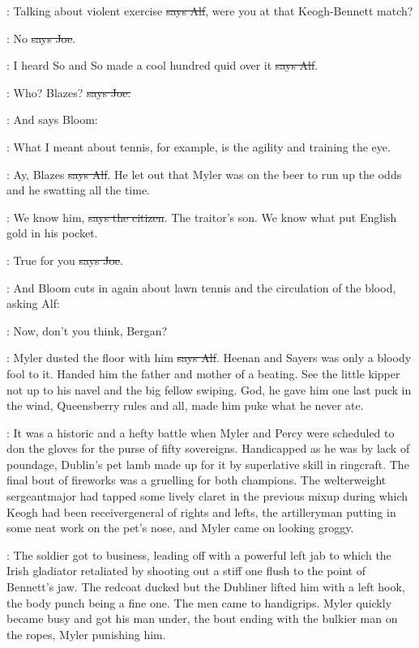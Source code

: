 \bergan:
Talking about violent exercise \sout{says Alf},
were you at that Keogh-Bennett match?

\joe:
No \sout{says Joe}.

\bergan:
I heard So and So made a cool hundred quid
over it \sout{says Alf}.

\joe:
Who? Blazes? \sout{says Joe.}

\Nq:
And says Bloom:

\Bloom:
What I meant about tennis, for example,
is the agility and training the eye.

\bergan:
Ay, Blazes \sout{says Alf}.
He let out that Myler was on the beer to run up
the odds and he swatting all the time.

\citizen:
We know him, \sout{says the citizen}.
The traitor's son. We know what put
English gold in his pocket.

\joe:
True for you \sout{says Joe}.

\Nq:
And Bloom cuts in again about lawn tennis and the circulation of the
blood, asking Alf:

\Bloom:
Now, don't you think, Bergan?

\bergan:
Myler dusted the floor with him \sout{says Alf}.
Heenan and Sayers was only a
bloody fool to it. Handed him the father and mother of a beating. See the
little kipper not up to his navel and the big fellow swiping. God, he gave
him one last puck in the wind, Queensberry rules and all, made him puke
what he never ate.

:
It was a historic and a hefty battle when Myler and Percy were
scheduled to don the gloves for the purse of fifty sovereigns. Handicapped
as he was by lack of poundage, Dublin's pet lamb made up for it by
superlative skill in ringcraft. The final bout of fireworks was a
gruelling for both champions. The welterweight sergeantmajor had
tapped some lively claret in the previous mixup during which Keogh
had been receivergeneral of rights and lefts, the artilleryman
putting in some neat work on the pet's nose, and Myler came on
looking groggy.

:
The soldier got to business, leading off with a
powerful left jab to which the Irish gladiator retaliated by shooting
out a stiff one flush to the point of Bennett's jaw. The redcoat
ducked but the Dubliner lifted him with a left hook, the body punch being
a fine one. The men came to handigrips. Myler quickly became busy and got
his man under, the bout ending with the bulkier man on the ropes, Myler
punishing him.

